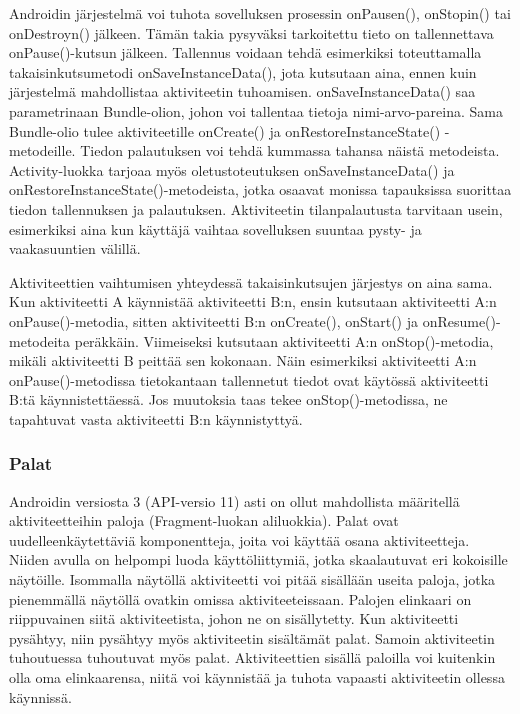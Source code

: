 Androidin järjestelmä voi tuhota sovelluksen prosessin onPausen(), onStopin() tai onDestroyn() jälkeen. Tämän takia pysyväksi tarkoitettu tieto on tallennettava onPause()-kutsun jälkeen. Tallennus voidaan tehdä esimerkiksi toteuttamalla takaisinkutsumetodi onSaveInstanceData(), jota kutsutaan aina, ennen kuin järjestelmä mahdollistaa aktiviteetin tuhoamisen. onSaveInstanceData() saa parametrinaan Bundle-olion, johon voi tallentaa tietoja nimi-arvo-pareina. Sama Bundle-olio tulee aktiviteetille onCreate() ja onRestoreInstanceState() -metodeille. Tiedon palautuksen voi tehdä kummassa tahansa näistä metodeista. Activity-luokka tarjoaa myös oletustoteutuksen onSaveInstanceData() ja onRestoreInstanceState()-metodeista, jotka osaavat monissa tapauksissa suorittaa tiedon tallennuksen ja palautuksen. Aktiviteetin tilanpalautusta tarvitaan usein, esimerkiksi aina kun käyttäjä vaihtaa sovelluksen suuntaa pysty- ja vaakasuuntien välillä.

Aktiviteettien vaihtumisen yhteydessä takaisinkutsujen järjestys on aina sama. Kun aktiviteetti A käynnistää aktiviteetti B:n, ensin kutsutaan aktiviteetti A:n onPause()-metodia, sitten aktiviteetti B:n onCreate(), onStart() ja onResume()-metodeita peräkkäin. Viimeiseksi kutsutaan aktiviteetti A:n onStop()-metodia, mikäli aktiviteetti B peittää sen kokonaan. Näin esimerkiksi aktiviteetti A:n onPause()-metodissa tietokantaan tallennetut tiedot ovat käytössä aktiviteetti B:tä käynnistettäessä. Jos muutoksia taas tekee onStop()-metodissa, ne tapahtuvat vasta aktiviteetti B:n käynnistyttyä.

\subsubsection*{Palat}

Androidin versiosta 3 (API-versio 11) asti on ollut mahdollista määritellä aktiviteetteihin paloja (Fragment-luokan aliluokkia). Palat ovat uudelleenkäytettäviä komponentteja, joita voi käyttää osana aktiviteetteja. Niiden avulla on helpompi luoda käyttöliittymiä, jotka skaalautuvat eri kokoisille näytöille. Isommalla näytöllä aktiviteetti voi pitää sisällään useita paloja, jotka pienemmällä näytöllä ovatkin omissa aktiviteeteissaan. Palojen elinkaari on riippuvainen siitä aktiviteetista, johon ne on sisällytetty. Kun aktiviteetti pysähtyy, niin pysähtyy myös aktiviteetin sisältämät palat. Samoin aktiviteetin tuhoutuessa tuhoutuvat myös palat. Aktiviteettien sisällä paloilla voi kuitenkin olla oma elinkaarensa, niitä voi käynnistää ja tuhota vapaasti aktiviteetin ollessa käynnissä.

